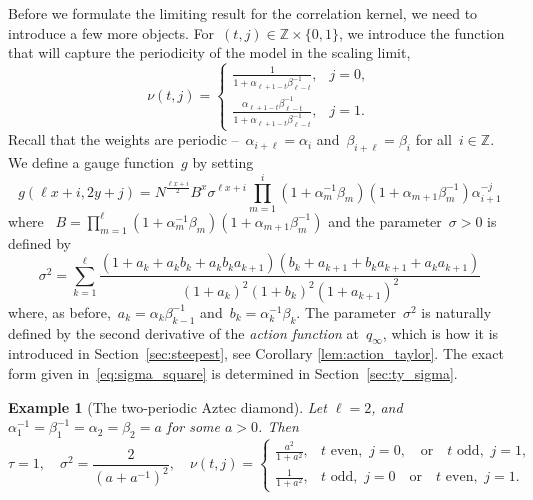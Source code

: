 \documentclass[11pt]{article}
\theoremstyle{plain}
\newtheorem{example}[theorem]{Example}
\theoremstyle{definition}
\numberwithin{equation}{section}
\newcommand{\ZZ}{\mathbb{Z}}
\begin{document}
Before we formulate the limiting result for the correlation kernel, we need to introduce a few more objects. For~$(t,j)\in \ZZ\times \{0,1\}$, we introduce the function that will capture the periodicity of the model in the scaling limit,
\begin{equation}\label{eq:period_function}
\nu(t,j)=
\begin{cases}
\frac{1}{1+\alpha_{\ell+1-t}\beta_{\ell-t}^{-1}}, & j=0, \\
\frac{\alpha_{\ell+1-t}\beta_{\ell-t}^{-1}}{1+\alpha_{\ell+1-t}\beta_{\ell-t}^{-1}}, & j=1.
\end{cases}
\end{equation}
Recall that the weights are periodic --~$\alpha_{i+\ell}=\alpha_i$ and~$\beta_{i+\ell}=\beta_i$ for all~$i\in \ZZ$. We define a gauge function~$g$ by setting
\begin{equation}\label{eq:gauge_function}
g(\ell x+i,2y+j)=N^{\frac{\ell x+i}{2}} B^{x}\sigma^{\ell x+i}
\prod_{m=1}^i(1+\alpha_m^{-1}\beta_m)(1+\alpha_{m+1}\beta_m^{-1})\alpha_{i+1}^{-j}
\end{equation}
where
~$B=\prod_{m=1}^\ell(1+\alpha_m^{-1}\beta_m)(1+\alpha_{m+1}\beta_m^{-1})$ and the parameter~$\sigma>0$ is defined by
\begin{equation}\label{eq:sigma_square}
\sigma^2=
\sum_{k=1}^\ell \frac{(1+a_k+a_kb_k+a_kb_ka_{k+1})(b_k+a_{k+1}+b_ka_{k+1}+a_ka_{k+1})}
{(1+a_k)^2(1+b_k)^2(1+a_{k+1})^2}
\end{equation}
where, as before,~$a_k=\alpha_k\beta_{k-1}^{-1}$ and~$b_k=\alpha_k^{-1}\beta_k$. The parameter~$\sigma^2$ is naturally defined by the second derivative of the \emph{action function} at~$q_\infty$, which is how it is introduced in Section~\ref{sec:steepest}, see Corollary \ref{lem:action_taylor}. The exact form given in~\eqref{eq:sigma_square} is determined in Section~\ref{sec:ty_sigma}. 
\begin{example}[The two-periodic Aztec diamond]
Let $\ell=2$, and $\alpha_1^{-1}=\beta_1^{-1}=\alpha_2=\beta_2=a$ for some $a>0$. Then
\begin{equation}
\tau=1, \quad \sigma^2=\frac{2}{(a+a^{-1})^2}, \quad 
\nu(t,j)=
\begin{cases}
\frac{a^2}{1+a^2}, & t \text{ even}, \,\, j=0, \quad \text{or} \quad t \text{ odd}, \,\, j=1, \\
\frac{1}{1+a^2}, & t \text{ odd}, \,\, j=0 \quad \text{or} \quad t \text{ even}, \,\, j=1.
\end{cases}
\end{equation}
\end{example}
\end{document}

